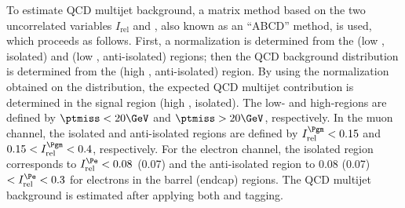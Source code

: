 To estimate QCD multijet background, a matrix method 
based on the two uncorrelated variables $I_\text{rel}$ 
and \ptmiss, also known as an ``ABCD'' method, is used, which proceeds 
as follows. First, a normalization is determined from the (low \ptmiss, isolated) and
(low \ptmiss, anti-isolated) regions; then the QCD background
distribution is determined from the (high \ptmiss, anti-isolated)
region. By using the normalization obtained on the distribution,
the expected QCD multijet contribution is determined in the signal
region (high \ptmiss, isolated). The low- and high-\ptmiss regions are
defined by $\ptmiss < 20\GeV$ and $\ptmiss > 20\GeV$, respectively. In
the muon channel, the isolated and anti-isolated regions are defined by
$I_\text{rel}^{\Pgm} < 0.15$ and $0.15 < I_\text{rel}^{\Pgm} < 0.4$, respectively. For the
electron channel, the isolated region corresponds to
$I_\text{rel}^{\Pe} < 0.08$ (0.07) and the anti-isolated region to
0.08 (0.07) $< I_\text{rel}^{\Pe} < 0.3$ for electrons in the barrel
(endcap) regions. The QCD multijet background is 
estimated after applying both \PQb and \PQc tagging.

